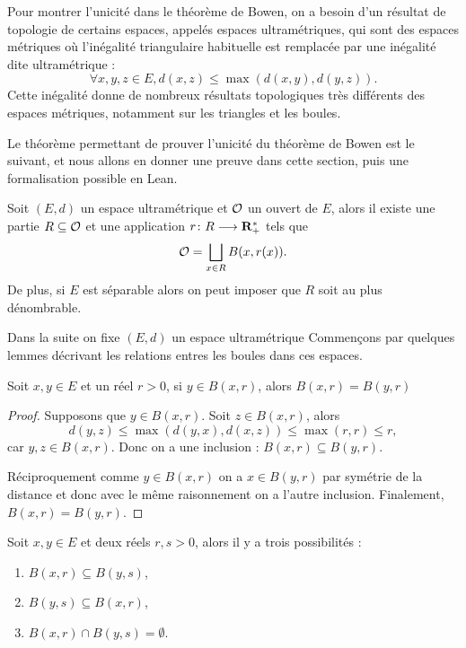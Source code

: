 \documentclass[../../rapport.tex]{subfiles}
\begin{document}
  Pour montrer l'unicité dans le théorème de Bowen, on a besoin d'un résultat de topologie de certains espaces,
  appelés espaces ultramétriques, qui sont des espaces métriques où l'inégalité triangulaire habituelle est remplacée
  par une inégalité dite ultramétrique :
  $$\forall x, y, z \in E, d(x, z) \le \max{(d(x, y), d(y, z))}.$$
  Cette inégalité donne de nombreux résultats topologiques très différents des espaces métriques,
  notamment sur les triangles et les boules.

  Le théorème permettant de prouver l'unicité du théorème de Bowen est le suivant,
  et nous allons en donner une preuve dans cette section,
  puis une formalisation possible en Lean.

  \begin{theorem}
    Soit $(E, d)$ un espace ultramétrique et $\mathcal{O}$ un ouvert de $E$,
    alors il existe une partie $R \subseteq \mathcal{O}$ et une application $r \colon R \longrightarrow \mathbf R^*_+$ tels que
    $$\mathcal{O} = \bigsqcup_{x \in R}{B(x, r(x))}.$$
    De plus, si $E$ est séparable alors on peut imposer que $R$ soit au plus dénombrable.
  \end{theorem}

  Dans la suite on fixe $(E, d)$ un espace ultramétrique
  Commençons par quelques lemmes décrivant les relations entres les boules dans ces espaces.

  \begin{lemma}
    \label{lem:ball_eq_of_mem}
    Soit $x, y \in E$ et un réel $r > 0$, si $y \in B(x, r)$, alors $B(x, r) = B(y, r)$
  \end{lemma}

  \begin{proof}
    Supposons que $y \in B(x, r)$. Soit $z \in B(x, r)$, alors
    $$d(y, z) \le \max{(d(y, x), d(x, z))} \le \max{(r, r)} \le r,$$
    car $y, z \in B(x, r)$. Donc on a une inclusion : $B(x, r) \subseteq B(y, r)$.

    Réciproquement comme $y \in B(x, r)$ on a $x \in B(y, r)$ par symétrie de la distance
    et donc avec le même raisonnement on a l'autre inclusion.
    Finalement, $B(x, r) = B(y, r)$.
  \end{proof}

  \begin{lemma}
    Soit $x, y \in E$ et deux réels $r, s > 0$, alors il y a trois possibilités :
    \begin{enumerate}
      \item $B(x, r) \subseteq B(y, s)$,
      \item $B(y, s) \subseteq B(x, r)$,
      \item $B(x, r) \cap B(y, s) = \emptyset$.
    \end{enumerate}
  \end{lemma}
\end{document}
